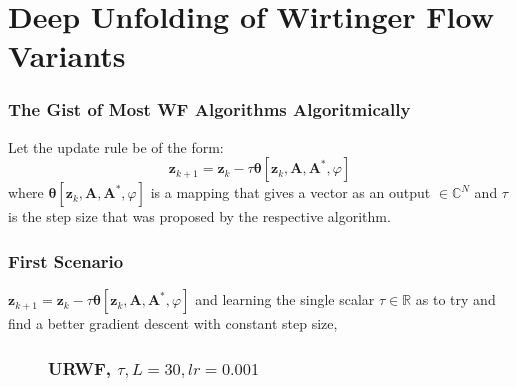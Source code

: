 \section[DU/AU of WF*]{Deep Unfolding of Wirtinger Flow Variants}
\begin{frame}
  \frametitle{The Gist of Most WF Algorithms Algoritmically}
  Let the update rule be of the form:
  \begin{equation}
    \boldsymbol{z}_{k+1} = \boldsymbol{z}_k - \tau\boldsymbol{\theta}[\boldsymbol{z}_k,\boldsymbol{A},\boldsymbol{A^*},\varphi]
  \end{equation}
  where $\boldsymbol{\theta}[\boldsymbol{z}_k,\boldsymbol{A},\boldsymbol{A^*},\varphi]$ is a mapping that gives a vector as an output 
  $\in\mathbb{C}^N$ and $\tau$ is the step size that was proposed by the respective algorithm.

  
  
\end{frame}


\begin{frame}
    \frametitle{First Scenario}
    \begin{center}
      $\boldsymbol{z}_{k+1} = \boldsymbol{z}_k - \tau\boldsymbol{\theta}[\boldsymbol{z}_k,\boldsymbol{A},\boldsymbol{A^*},\varphi]$ 
      and learning the single scalar $\tau \in \mathbb{R}$ as to try and find a better gradient descent with constant step size,  
    \end{center}    
\end{frame}

\begin{frame}
  \begin{figure}
    \frametitle{URWF, $\tau,L=30,lr=0.001$}
    \centering
    \resizebox{0.9\textwidth}{!}{}
    \label{fig:rwf_s_00_l_30_lr_0.001}
  \end{figure}
\end{frame}


